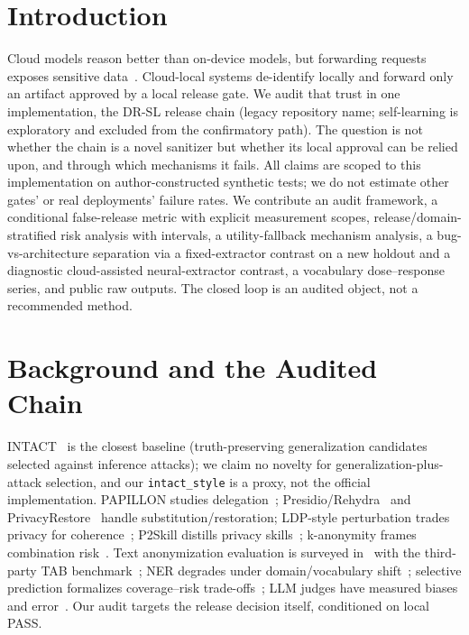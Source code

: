 \documentclass[conference]{IEEEtran}
\begin{document}
\section{Introduction}
Cloud models reason better than on-device models, but forwarding requests exposes sensitive data~\cite{hao2024hybrid,siyan2025papillon,das2025security,lukas2023pii}. Cloud-local systems de-identify locally and forward only an artifact approved by a local release gate. We audit that trust in one implementation, the DR-SL release chain (legacy repository name; self-learning is exploratory and excluded from the confirmatory path). The question is not whether the chain is a novel sanitizer but whether its local approval can be relied upon, and through which mechanisms it fails. All claims are scoped to this implementation on author-constructed synthetic tests; we do not estimate other gates' or real deployments' failure rates. We contribute an audit framework, a conditional false-release metric with explicit measurement scopes, release/domain-stratified risk analysis with intervals, a utility-fallback mechanism analysis, a bug-vs-architecture separation via a fixed-extractor contrast on a new holdout and a diagnostic cloud-assisted neural-extractor contrast, a vocabulary dose--response series, and public raw outputs. The closed loop is an audited object, not a recommended method.

\section{Background and the Audited Chain}
INTACT~\cite{pilan2025truthful} is the closest baseline (truth-preserving generalization candidates selected against inference attacks); we claim no novelty for generalization-plus-attack selection, and our \texttt{intact\_style} is a proxy, not the official implementation. PAPILLON studies delegation~\cite{siyan2025papillon}; Presidio/Rehydra~\cite{presidio,rehydra} and PrivacyRestore~\cite{zeng2025privacyrestore} handle substitution/restoration; LDP-style perturbation trades privacy for coherence~\cite{mai2023split,duchi2013local}; P2Skill distills privacy skills~\cite{ryu2026p2skill}; k-anonymity frames combination risk~\cite{sweeney2002k}. Text anonymization evaluation is surveyed in~\cite{lison2021anonymisation} with the third-party TAB benchmark~\cite{pilan2022tab}; NER degrades under domain/vocabulary shift~\cite{liu2021crossner}; selective prediction formalizes coverage--risk trade-offs~\cite{geifman2017selective,kamath2020selective}; LLM judges have measured biases and error~\cite{zheng2023judging,liu2023geval}. Our audit targets the release decision itself, conditioned on local PASS.
\end{document}
